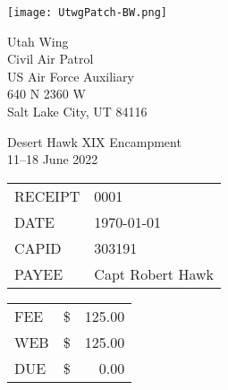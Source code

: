 \documentclass[8pt]{extarticle}
\begin{document}
\small
\noindent
\parbox{.33\textwidth}{%
    \texttt{[image: UtwgPatch-BW.png]}
}
\parbox{.67\textwidth}{%
    Utah Wing \\
    Civil Air Patrol \\
    US Air Force Auxiliary \\
    640 N 2360 W \\
    Salt Lake City, UT 84116
}

\begin{center}

Desert Hawk XIX Encampment \\
11--18 June 2022

\vspace{1em}

\begin{tabularx}{\textwidth}{lX}
    RECEIPT & 0001   \\
    DATE    & \today \\
    CAPID   & 303191 \\
    PAYEE   & Capt Robert Hawk \\
\end{tabularx}

\vspace{1em}

\begin{tabularx}{\textwidth}{Xcr}
    \toprule
    FEE      & \$ & 125.00 \\
    WEB      & \$ & 125.00 \\
    \midrule
    DUE      & \$ &   0.00 \\
    \bottomrule
\end{tabularx}
\end{center}
\end{document}
